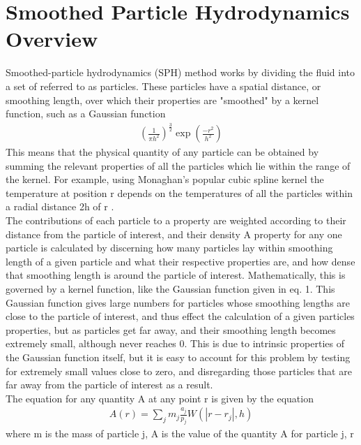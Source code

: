 \documentclass{sigchi}
\begin{document}
\section{Smoothed Particle Hydrodynamics Overview}
%
\hspace{6 pt} Smoothed-particle hydrodynamics (SPH) method works by dividing the fluid into a set of 
referred to as particles. These particles have a spatial distance, or smoothing length, over which 
their properties are "smoothed" by a kernel function, such as a Gaussian function
\begin{align}
(\frac{1}{\pi h^2})^\frac{3}{2}  \exp{(\frac{-r^2}{h^2})}
\end{align}
This means that the physical quantity of any particle can be obtained by summing the 
relevant properties of all the particles which lie within the range of the kernel. For 
example, using Monaghan's popular cubic spline kernel the temperature at position r 
depends on the temperatures of all the particles within a radial distance 2h of r \cite{wikiarticle}.
\\
\hspace*{6 pt} The contributions of each particle to a property are weighted according to their distance 
from the particle of interest, and their density
A property for any one particle is calculated by discerning how many particles lay within
smoothing length of a given particle and what their respective properties are, and how 
dense that smoothing length is around the particle of interest. Mathematically, this is 
governed by a kernel function, like the Gaussian function given in eq. 1. This Gaussian
function gives large numbers for particles whose smoothing lengths are close to the 
particle of interest, and thus effect the calculation of a given particles properties, 
but as particles get far away, and their smoothing length becomes extremely small, 
although never reaches 0. This is due to intrinsic properties of the 
Gaussian function itself, but it is easy to account for this problem by testing for 
extremely small values close to zero, and disregarding those particles that are far away 
from the particle of interest as a result.
\\
\hspace*{6 pt} The equation for any quantity A at any point r is given by the equation
\begin{align}
A(r) = \sum_{j} m_j \frac{a_j}{p_j} W (|r - r_j|,h)
\end{align}
where m is the mass of particle j, A is the value of the quantity A for particle j, r 
\end{document}

